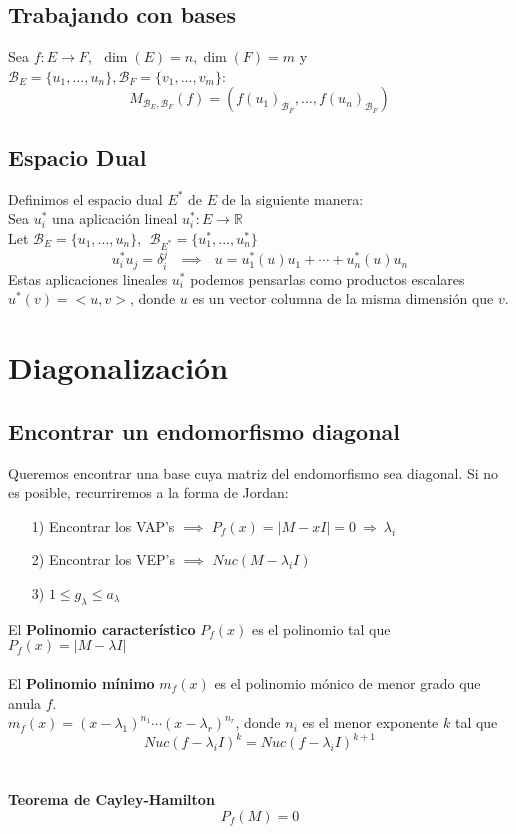 \documentclass[12pt]{article}
\begin{document}
	\subsection{Trabajando con bases}
	Sea $f: E \to F, \ \ \dim(E)=n, \dim(F)=m$ y $\mathcal{B}_E=\{u_1,...,u_n\}, \mathcal{B}_F=\{v_1,...,v_m\}$:
	\[\boxed{M_{\mathcal{B}_E,\mathcal{B}_F}(f)=(f(u_1)_{\mathcal{B}_F},...,f(u_n)_{\mathcal{B}_F})}\]
	
	\subsection{Espacio Dual}
	Definimos el espacio dual $E^*$ de $E$ de la siguiente manera:\\
	Sea $u_i^*$ una aplicación lineal $u_i^*: E\to \mathbb{R}$ \\
	Let $\mathcal{B}_E=\{u_1,..., u_n\}, \ \ \mathcal{B}_{E^*}=\{u_1^*,..., u_n^*\}$
	\[u_i^*u_j=\delta_i^j \ \ \ \implies \ \ \ u=u_1^*(u)u_1+\cdots + u_n^*(u)u_n\]
	Estas aplicaciones lineales $u_i^*$ podemos pensarlas como productos escalares $u^*(v)=<u, v>$, donde $u$ es un vector columna de la misma dimensión que $v$.
	
	
\section{Diagonalización}
	\subsection{Encontrar un endomorfismo diagonal}
	Queremos encontrar una base cuya matriz del endomorfismo sea diagonal. Si no es posible, recurriremos a la forma de Jordan:
	\begin{itemize}
		\item[1)] Encontrar los VAP's  $\implies$  $P_f(x)=|M-x I|=0\ \Rightarrow\ \lambda_i$
		\item[2)] Encontrar los VEP's  $\implies$  $Nuc(M-\lambda_iI)$
		\item[3)] $1\leq g_\lambda\leq a_\lambda$
	\end{itemize}
	El \textbf{Polinomio característico} $P_f(x)$ es el polinomio tal que $P_f(x)=|M-\lambda I|$\\ \\
	El \textbf{Polinomio mínimo} $m_f(x)$ es el polinomio mónico de menor grado que anula $f$. \\
	$m_f(x) = (x-\lambda_1)^{n_1}\cdots (x-\lambda_r)^{n_r}$, donde $n_i$ es el menor exponente $k$ tal que \[Nuc(f-\lambda_iI)^k=Nuc(f-\lambda_iI)^{k+1}\] \\ \\	
	\textbf{Teorema de Cayley-Hamilton}
	\[P_f(M) = 0\]
	
\end{document}
